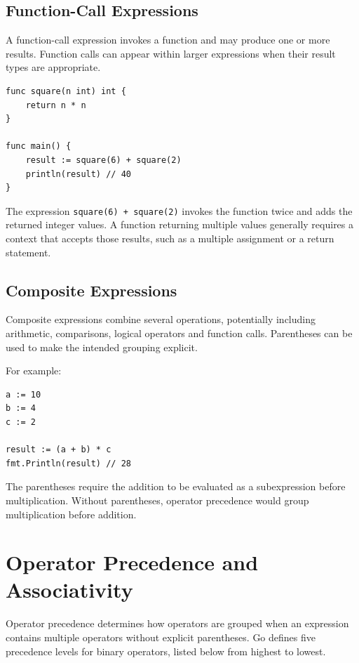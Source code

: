 \subsection{Function-Call Expressions}

A function-call expression invokes a function and may produce
one or more results. Function calls can appear within larger
expressions when their result types are appropriate.

\begin{lstlisting}
func square(n int) int {
    return n * n
}

func main() {
    result := square(6) + square(2)
    println(result) // 40
}
\end{lstlisting}

The expression \texttt{square(6) + square(2)} invokes the
function twice and adds the returned integer values.
A function returning multiple values generally requires a
context that accepts those results, such as a multiple
assignment or a return statement.

\subsection{Composite Expressions}

Composite expressions combine several operations, potentially
including arithmetic, comparisons, logical operators and
function calls. Parentheses can be used to make the intended
grouping explicit.

For example:

\begin{lstlisting}
a := 10
b := 4
c := 2

result := (a + b) * c
fmt.Println(result) // 28
\end{lstlisting}

The parentheses require the addition to be evaluated as
a subexpression before multiplication. Without parentheses,
operator precedence would group multiplication before
addition.

\section{Operator Precedence and Associativity}

Operator precedence determines how operators are grouped
when an expression contains multiple operators without
explicit parentheses. Go defines five precedence levels
for binary operators, listed below from highest to lowest.


